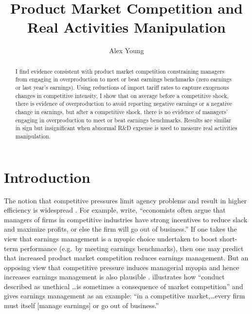 \documentclass[notitlepage, 12pt]{article}
\title{Product Market Competition and Real Activities Manipulation}
\author{Alex Young}
\begin{document}
\maketitle
\begin{abstract}
\noindent I find evidence consistent with product market competition constraining managers from engaging in overproduction to meet or beat earnings benchmarks (zero earnings or last year's earnings). Using reductions of import tariff rates to capture exogenous changes in competitive intensity, I show that on average before a competitive shock, there is evidence of overproduction to avoid reporting negative earnings or a negative change in earnings, but after a competitive shock, there is no evidence of managers' engaging in overproduction to meet or beat earnings benchmarks. Results are similar in sign but insignificant when abnormal R\&D expense is used to measure real activities manipulation.
\end{abstract}
\newpage


\section{Introduction}
The notion that competitive pressures limit agency problems and result in higher efficiency is widespread \citep{bd:2004}. For example, \citet{gm:2011} write, ``economists often argue that managers of firms in competitive industries have strong incentives to reduce slack and maximize profits, or else the firm will go out of business.'' If one takes the view that earnings management is a myopic choice undertaken to boost short-term performance (e.g.\ by meeting earnings benchmarks), then one may predict that increased product market competition reduces earnings management. But an opposing view that competitive pressure induces managerial myopia and hence increases earnings management is also plausible \citep*{kst:2012}. \citet{shleifer:2004} illustrates how ``conduct described as unethical \ldots is sometimes a consequence of market competition'' and gives earnings management as an example: ``in a competitive market,\ldots every firm must itself [manage earnings] or go out of business.''
\newline
\end{document}
